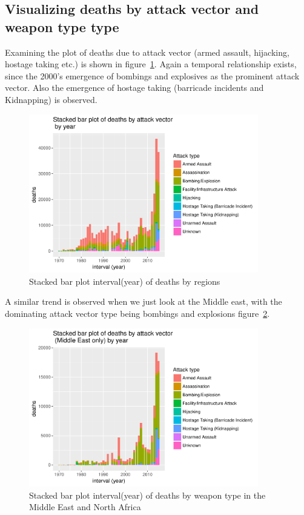 \subsection{Visualizing deaths by attack vector and weapon type
type}\label{viewing-deaths-by-attack-vector-type}

Examining the plot of deaths due to attack vector (armed assault,
hijacking, hostage taking etc.) is shown in figure~\ref{fig:stackbaryearattackvector1}. Again a temporal relationship exists, since the 2000's emergence of bombings and explosives
as the prominent attack vector. Also the emergence of hostage taking
(barricade incidents and Kidnapping) is observed.

\begin{figure}[t]
\includegraphics[width=10cm]{Peters_experiment_markdown_files/figure-latex/unnamed-chunk-7-1.pdf}
\caption{Stacked bar plot interval(year) of deaths by regions}
\label{fig:stackbaryearattackvector1}
\centering
\end{figure}

A similar trend is observed when we just look at the Middle east, with the dominating attack vector type being bombings and explosions figure~\ref{fig:stackbaryearattackvectormideast}.

\begin{figure}[t]
\includegraphics[width=10cm]{Peters_experiment_markdown_files/figure-latex/unnamed-chunk-8-1.pdf}
\caption{Stacked bar plot interval(year) of deaths by weapon type in the Middle East and North Africa}
\label{fig:stackbaryearattackvectormideast}
\centering
\end{figure}

